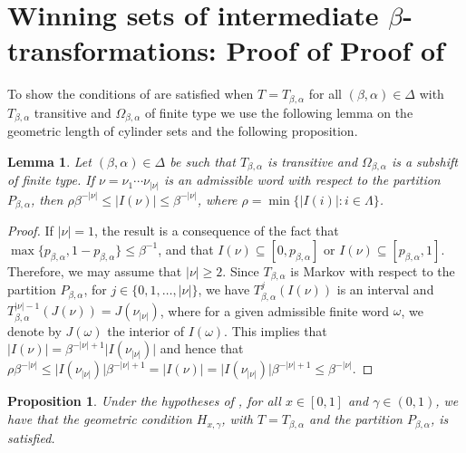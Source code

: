 \documentclass[a4paper,reqno,10pt]{amsart}
\newtheorem{lemma}[theorem]{Lemma}
\newtheorem{proposition}[theorem]{Proposition}
\begin{document}
%
%
%
\section{Winning sets of intermediate \texorpdfstring{$\beta$}{beta}-transformations: Proof of Proof of \texorpdfstring{}{Theorem 1.6}}\label{sec:proof_thm_1_6}
%
%
%

To show the conditions of  are satisfied when $T=T_{\beta, \alpha}$ for all $(\beta, \alpha) \in \Delta$ with $T_{\beta, \alpha}$ transitive and $\Omega_{\beta, \alpha}$ of finite type we use the following lemma on the geometric length of cylinder sets and the following proposition.

\begin{lemma}\label{lem:geometric_lengths_of_cylinders}
Let $(\beta, \alpha) \in \Delta$ be such that $T_{\beta, \alpha}$ is transitive and $\Omega_{\beta, \alpha}$ is a subshift of finite type. If $\nu = \nu_{1} \cdots \nu_{\lvert \nu \rvert}$ is an admissible word with respect to the partition $P_{\beta,\alpha}$, then $\rho \beta^{-\lvert \nu \rvert} \leq  \lvert I(\nu) \rvert \leq \beta^{-\lvert \nu \rvert}$, where $\rho = \min \{ \lvert I(i) \rvert \colon i \in \Lambda \}$.
\end{lemma}

\begin{proof}
If $\lvert \nu \rvert = 1$, the result is a consequence of the fact that $\max\{ p_{\beta,\alpha}, 1 - p_{\beta,\alpha}\} \leq \beta^{-1}$, and that $I(\nu) \subseteq [0, p_{\beta,\alpha}]$ or $I(\nu) \subseteq [p_{\beta,\alpha},1]$.  Therefore, we may assume that $\lvert \nu \rvert \geq 2$.  Since $T_{\beta, \alpha}$ is Markov with respect to the partition $P_{\beta,\alpha}$, for $j \in \{ 0, 1, \ldots, \lvert \nu \rvert \}$, we have $T_{\beta,\alpha}^{j}(I(\nu))$ is an interval and  $T_{\beta,\alpha}^{\lvert \nu \rvert - 1}(J(\nu)) = J(\nu_{\lvert \nu \rvert})$, where for a given admissible finite word $\omega$, we denote by $J(\omega)$ the interior of $I(\omega)$. 
This implies that $\lvert I(\nu) \rvert = \beta^{-\lvert \nu \rvert + 1}\lvert I(\nu_{\lvert \nu \rvert}) \rvert$ and hence that $\rho \beta^{-\lvert \nu \rvert} \leq  \lvert I(\nu_{\lvert \nu \rvert}) \rvert \beta^{-\lvert \nu \rvert + 1} = \lvert I(\nu) \rvert = \lvert I(\nu_{\lvert \nu \rvert}) \rvert \beta^{-\lvert \nu \rvert + 1} \leq  \beta^{-\lvert \nu \rvert}$.
\end{proof}

\begin{proposition}\label{prop:thm_SFT+Transitive_implies_winning}
Under the hypotheses of , for all $x \in [0, 1]$ and $\gamma \in (0, 1)$, we have that the geometric condition $H_{x, \gamma}$, with $T = T_{\beta, \alpha}$ and the partition $P_{\beta,\alpha}$, is satisfied.
\end{proposition}
\end{document}
